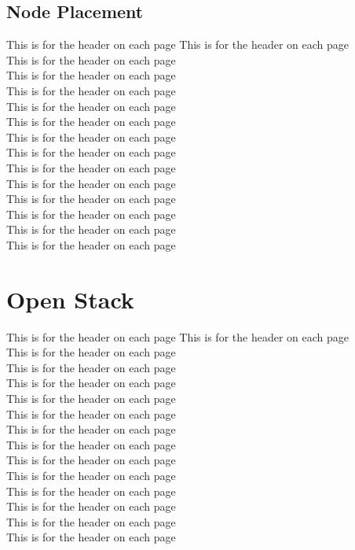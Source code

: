\subsection{Node Placement}
This is for the header on each page
This is for the header on each page\\
This is for the header on each page\\
This is for the header on each page\\
This is for the header on each page\\
This is for the header on each page\\
This is for the header on each page\\
This is for the header on each page\\
This is for the header on each page\\
This is for the header on each page\\
This is for the header on each page\\
This is for the header on each page\\
This is for the header on each page\\
This is for the header on each page\\
This is for the header on each page

\section{Open Stack}
This is for the header on each page
This is for the header on each page\\
This is for the header on each page\\
This is for the header on each page\\
This is for the header on each page\\
This is for the header on each page\\
This is for the header on each page\\
This is for the header on each page\\
This is for the header on each page\\
This is for the header on each page\\
This is for the header on each page\\
This is for the header on each page\\
This is for the header on each page\\
This is for the header on each page\\
This is for the header on each page


